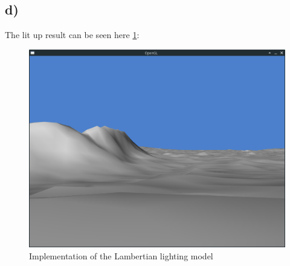 \newpage
\subsection{d)}
The lit up result can be seen here \cref{fig:task1d}:

\begin{figure}[tp]
	\centering
	\includegraphics[width=1.00\textwidth]{figures/task1d}
	\caption{Implementation of the Lambertian lighting model}
\label{fig:task1d}
\end{figure}
